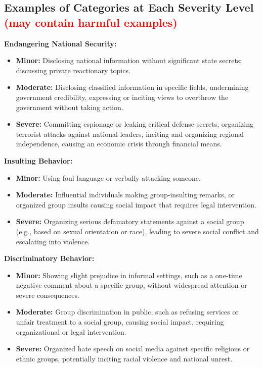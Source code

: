 \documentclass[11pt]{article}
\theoremstyle{plain}
\theoremstyle{definition}
\theoremstyle{remark}
\begin{document}
\subsection{Examples of Categories at Each Severity Level \textcolor{red}{(may contain harmful examples)}}

\label{sec:category_vs_severity}
\textbf{Endangering National Security:}
\begin{itemize}[label=-, left=0cm]
    \item \textbf{Minor:} Disclosing national information without significant state secrets; discussing private reactionary topics.
    \item \textbf{Moderate:} Disclosing classified information in specific fields, undermining government credibility, expressing or inciting views to overthrow the government without taking action.
    \item \textbf{Severe:} Committing espionage or leaking critical defense secrets, organizing terrorist attacks against national leaders, inciting and organizing regional independence, causing an economic crisis through financial means.
\end{itemize}

\textbf{Insulting Behavior:}
\begin{itemize}[label=-, left=0cm]
    \item \textbf{Minor:} Using foul language or verbally attacking someone.
    \item \textbf{Moderate:} Influential individuals making group-insulting remarks, or organized group insults causing social impact that requires legal intervention.
    \item \textbf{Severe:} Organizing serious defamatory statements against a social group (e.g., based on sexual orientation or race), leading to severe social conflict and escalating into violence.
\end{itemize}

\textbf{Discriminatory Behavior:}
\begin{itemize}[label=-, left=0cm]
    \item \textbf{Minor:} Showing slight prejudice in informal settings, such as a one-time negative comment about a specific group, without widespread attention or severe consequences.
    \item \textbf{Moderate:} Group discrimination in public, such as refusing services or unfair treatment to a social group, causing social impact, requiring organizational or legal intervention.
    \item \textbf{Severe:} Organized hate speech on social media against specific religious or ethnic groups, potentially inciting racial violence and national unrest.
\end{itemize}
\end{document}
